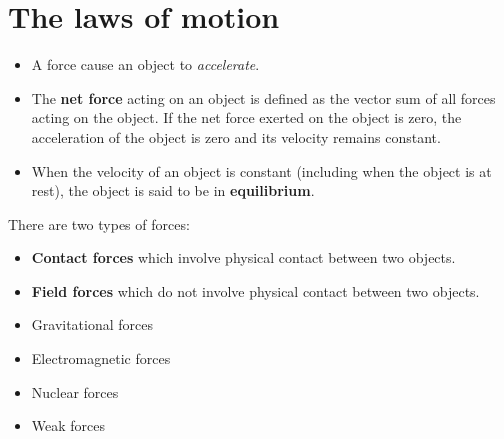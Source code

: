 \chapter{The laws of motion}


            \begin{itemize}
                \item A force cause an object to \textit{accelerate}.
                \item The \textbf{net force} acting on an object is defined as the vector
                sum of all forces acting on the object. If the net force exerted on the
                object is zero, the acceleration of the object is zero and its velocity
                remains constant.
                \item When the velocity of an object is constant (including when the object
                is at rest), the object is said to be in \textbf{equilibrium}.
            \end{itemize}
            
            \par There are two types of forces:
            \begin{itemize}
            \item \textbf{Contact forces} which involve physical contact between two objects.
            \item \textbf{Field forces} which do not involve physical contact between two
                objects.
            \end{itemize}

            \begin{itemize}
                \item Gravitational forces
                \item Electromagnetic forces
                \item Nuclear forces
                \item Weak forces
            \end{itemize}

